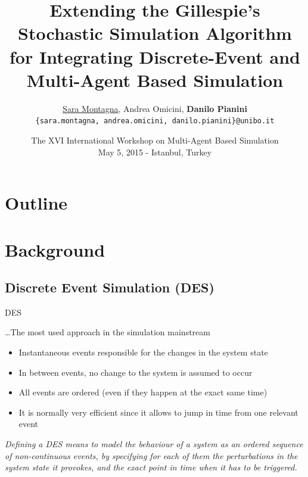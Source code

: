 \documentclass[presentation]{beamer} %
\title[Gillespie's SSA to Integrate DES and MABS]{Extending the Gillespie's Stochastic Simulation Algorithm for Integrating Discrete-Event and Multi-Agent Based Simulation}
\author[Montagna, Omicini, Pianini]{
\underline{Sara Montagna}, Andrea Omicini, \textbf{Danilo Pianini}\\
\texttt{{\footnotesize \{sara.montagna, andrea.omicini, danilo.pianini\}@unibo.it}}}
\institute[UNIBO]
{\textsc{Alma Mater Studiorum}---Universit\`a di Bologna a Cesena}
\date[2015-05-15 MABS]{The XVI International Workshop on Multi-Agent Based Simulation\\
\scriptsize May 5, 2015 - Istanbul, Turkey
}
\begin{document}
\frame[label=coverpage]{\titlepage}

\section*{Outline}
\frame{\tableofcontents}



\section{Background}

\subsection{Discrete Event Simulation (DES)}


\begin{frame}{DES}

\ldots The most used approach in the simulation mainstream
\begin{block}{}
	\begin{itemize}
    		\item Instantaneous events responsible for the changes in the system state
    		\item In between events, no change to the system is assumed to occur
    		\item All events are ordered (even if they happen at the exact same time)
		\item It is normally very efficient since it allows to jump in time from one relevant event
	\end{itemize}
\end{block}

		
\emph{Defining a DES means to model the behaviour of a system as an ordered sequence of non-continuous events, by specifying for each of them the \emph{perturbations} in the system state it provokes, and the exact point in time when it has to be triggered. }

\end{frame}
\end{document}

